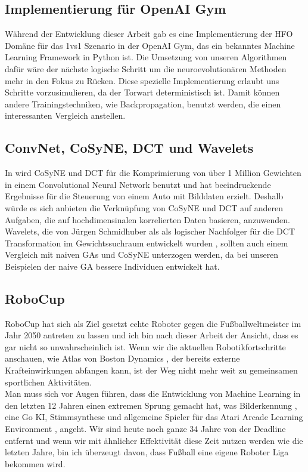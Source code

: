         \subsection*{Implementierung für OpenAI Gym}
            Während der Entwicklung dieser Arbeit gab es eine Implementierung der HFO Domäne für das 1vs1 Szenario in der OpenAI Gym, das ein bekanntes Machine Learning Framework in Python ist. Die Umsetzung von unseren Algorithmen dafür wäre der nächste logische Schritt um die neuroevolutionären Methoden mehr in den Fokus zu Rücken. Diese spezielle Implementierung erlaubt uns Schritte vorzusimulieren, da der Torwart deterministisch ist. Damit können andere Trainingstechniken, wie Backpropagation, benutzt werden, die einen interessanten Vergleich anstellen.

        \subsection*{ConvNet, CoSyNE, DCT und Wavelets}
            In \cite{cosyne4} wird CoSyNE und DCT für die Komprimierung von über 1 Million Gewichten in einem Convolutional Neural Network benutzt und hat beeindruckende Ergebnisse für die Steuerung von einem Auto mit Bilddaten erzielt. Deshalb würde es sich anbieten die Verknüpfung von CoSyNE und DCT auf anderen Aufgaben, die auf hochdimensinalen korrelierten Daten basieren, anzuwenden. \\

            \noindent
            Wavelets, die von Jürgen Schmidhuber als als logischer Nachfolger für die DCT Transformation im Gewichtssuchraum entwickelt wurden \cite{wavelet}, sollten auch einem Vergleich mit naiven GAs und CoSyNE unterzogen werden, da bei unseren Beispielen der naive GA bessere Individuen entwickelt hat.

        \subsection*{RoboCup}
            RoboCup hat sich als Ziel gesetzt echte Roboter gegen die Fußballweltmeister im Jahr 2050 antreten zu lassen und ich bin nach dieser Arbeit der Ansicht, dass es gar nicht so unwahrscheinlich ist. Wenn wir die aktuellen Robotikfortschritte anschauen, wie Atlas von Boston Dynamics \cite{robot}, der bereits externe Krafteinwirkungen abfangen kann, ist der Weg nicht mehr weit zu gemeinsamen sportlichen Aktivitäten.\\

            \noindent
            Man muss sich vor Augen führen, dass die Entwicklung von Machine Learning in den letzten 12 Jahren einen extremen Sprung gemacht hat, was Bilderkennung \cite{NIPS2012_4824}, eine Go KI, Stimmsynthese und allgemeine Spieler für das Atari Arcade Learning Environment \cite{Naddaf2010}, angeht. Wir sind heute noch ganze 34 Jahre von der Deadline entfernt und wenn wir mit ähnlicher Effektivität diese Zeit nutzen werden wie die letzten Jahre, bin ich überzeugt davon, dass Fußball eine eigene Roboter Liga bekommen wird.
